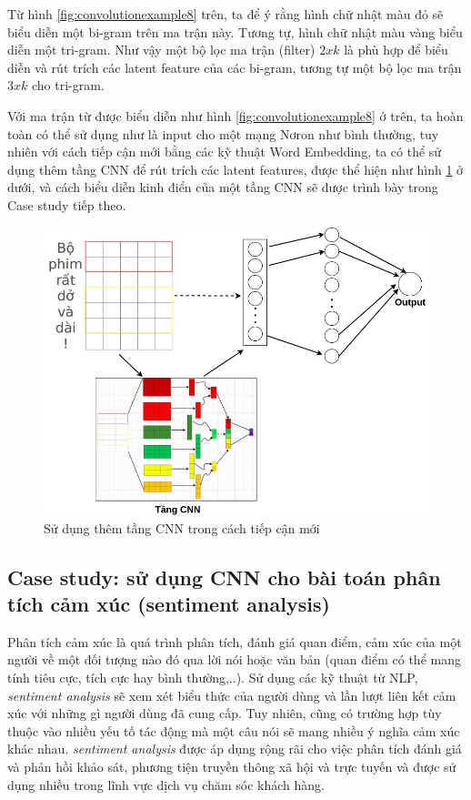 Từ hình \ref{fig:convolutionexample8} trên, ta để ý rằng hình chữ nhật màu đỏ sẽ biểu diễn một bi-gram trên ma trận này. Tương tự, hình chữ nhật màu vàng biểu diễn một tri-gram. Như vậy một bộ lọc ma trận (filter) $2xk$ là phù hợp để biểu diễn và rút trích các latent feature của các bi-gram, tương tự một bộ lọc ma trận $3xk$ cho tri-gram.

Với ma trận từ được biểu diễn như hình \ref{fig:convolutionexample8} ở trên, ta hoàn toàn có thể sử dụng như là input cho một mạng Nơron như bình thường, tuy nhiên với cách tiếp cận mới bằng các kỹ thuật Word Embedding, ta có thể sử dụng thêm tầng CNN để rút trích các latent features, được thể hiện như hình \ref{fig:convolutionexample9} ở dưới, và cách biểu diễn kinh điển của một tầng CNN sẽ được trình bày trong Case study tiếp theo.
\clearpage
\begin{figure}[!h]
	\centering
		\includegraphics[width=1\columnwidth]{chapter05/figure/convolution-example-9.jpg}
        \caption{Sử dụng thêm tầng CNN trong cách tiếp cận mới}
        \label{fig:convolutionexample9}
\end{figure}

\subsection{Case study: sử dụng CNN cho bài toán phân tích cảm xúc (sentiment analysis)}
Phân tích cảm xúc là quá trình phân tích, đánh giá quan điểm, cảm xúc của một người về một đối tượng nào đó qua lời nói hoặc văn bản (quan điểm có thể mang tính tiêu cực, tích cực hay bình thường,..). Sử dụng các kỹ thuật từ NLP, \textit{sentiment analysis} sẽ xem xét biểu thức của người dùng và lần lượt liên kết cảm xúc với những gì người dùng đã cung cấp. Tuy nhiên, cũng có trường hợp tùy thuộc vào nhiều yếu tố tác động mà một câu nói sẽ mang nhiều ý nghĩa cảm xúc khác nhau. \textit{sentiment analysis} được áp dụng rộng rãi cho việc phân tích đánh giá và phản hồi khảo sát, phương tiện truyền thông xã hội và trực tuyến và được sử dụng nhiều trong lĩnh vực dịch vụ chăm sóc khách hàng.

